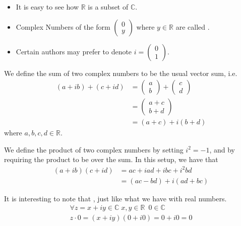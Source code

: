\documentclass[11pt, oneside]{book}
\begin{document}
\begin{note}
	\begin{itemize}
		\item It is easy to see how $\mathbb{R}$ is a subset of $\mathbb{C}$.
		\item Complex Numbers of the form $\left(\begin{smallmatrix} 0 \\ y \end{smallmatrix}\right)$ where $y \in \mathbb{R}$ are called .
		\item Certain authors may prefer to denote $i = \left(\begin{smallmatrix} 0 \\ 1 \end{smallmatrix}\right)$.
	\end{itemize}
\end{note}

\begin{defn}\label{defn:Sum and Product}
	We define the sum of two complex numbers to be the usual vector sum, i.e.
	\begin{align*}
		(a + ib) + (c + id) &= \begin{pmatrix} a \\ b \end{pmatrix} + \begin{pmatrix} c \\ d \end{pmatrix} \\
											&= \begin{pmatrix} a + c \\ b + d \end{pmatrix} \\
											&= (a + c) + i (b + d)
	\end{align*}
	where $a, b, c, d \in \mathbb{R}$.

	We define the product of two complex numbers by setting $i^2 = -1$, and by requiring the product to be  over the sum. In this setup, we have that
	\begin{align}
		(a + ib)(c + id) &= ac + iad + ibc + i^2 bd \nonumber \\
						 &= (ac - bd) + i (ad + bc) \label{eq:complex multiplication}
	\end{align}
\end{defn}

\begin{note}
 It is interesting to note that , just like what we have with real numbers.
 \begin{gather*}
 	\forall z = x + iy \in \mathbb{C} \; x, y \in \mathbb{R} \enspace 0 \in \mathbb{C} \\
 	z \cdot 0 = (x + iy)(0 + i0) = 0 + i0 = 0
 \end{gather*}
\end{note}
\end{document}
